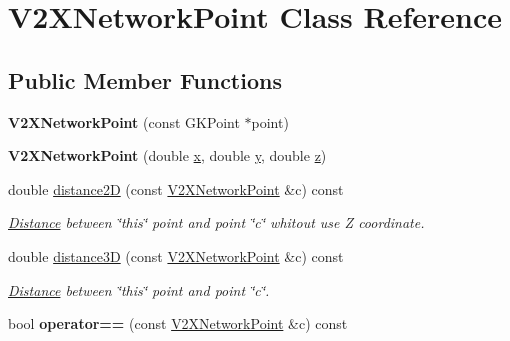 \hypertarget{classV2XNetworkPoint}{}\section{V2\+X\+Network\+Point Class Reference}
\label{classV2XNetworkPoint}
\subsection*{Public Member Functions}
\begin{DoxyCompactItemize}
\item 
{\bfseries V2\+X\+Network\+Point} (const G\+K\+Point $\ast$point)\hypertarget{classV2XNetworkPoint_a50df68a322403c29b3da7d0ed8318d51}{}\label{classV2XNetworkPoint_a50df68a322403c29b3da7d0ed8318d51}

\item 
{\bfseries V2\+X\+Network\+Point} (double \hyperlink{classV2XNetworkPoint_aa6a4037956d1a22a58773a5479859bf7}{x}, double \hyperlink{classV2XNetworkPoint_a3fef59e6c844bf8264fc4e87fca4ee23}{y}, double \hyperlink{classV2XNetworkPoint_a397af9d980acf003e0ac8b86579047eb}{z})\hypertarget{classV2XNetworkPoint_a8a61e854b4e407e0d9830629208d78d7}{}\label{classV2XNetworkPoint_a8a61e854b4e407e0d9830629208d78d7}

\item 
double \hyperlink{classV2XNetworkPoint_afaafa38debbcea63128ca1d81108793b}{distance2D} (const \hyperlink{classV2XNetworkPoint}{V2\+X\+Network\+Point} \&c) const \hypertarget{classV2XNetworkPoint_afaafa38debbcea63128ca1d81108793b}{}\label{classV2XNetworkPoint_afaafa38debbcea63128ca1d81108793b}

\begin{DoxyCompactList}\small\item\em \hyperlink{structDistance}{Distance} between \char`\"{}this\char`\"{} point and point \char`\"{}c\char`\"{} whitout use Z coordinate. \end{DoxyCompactList}\item 
double \hyperlink{classV2XNetworkPoint_a43c60b6d40208202bfb4d5a482d3d0e5}{distance3D} (const \hyperlink{classV2XNetworkPoint}{V2\+X\+Network\+Point} \&c) const \hypertarget{classV2XNetworkPoint_a43c60b6d40208202bfb4d5a482d3d0e5}{}\label{classV2XNetworkPoint_a43c60b6d40208202bfb4d5a482d3d0e5}

\begin{DoxyCompactList}\small\item\em \hyperlink{structDistance}{Distance} between \char`\"{}this\char`\"{} point and point \char`\"{}c\char`\"{}. \end{DoxyCompactList}\item 
bool {\bfseries operator==} (const \hyperlink{classV2XNetworkPoint}{V2\+X\+Network\+Point} \&c) const \hypertarget{classV2XNetworkPoint_abe1a16475f530229b13e1495ab3fea16}{}\label{classV2XNetworkPoint_abe1a16475f530229b13e1495ab3fea16}


\end{DoxyCompactItemize}
